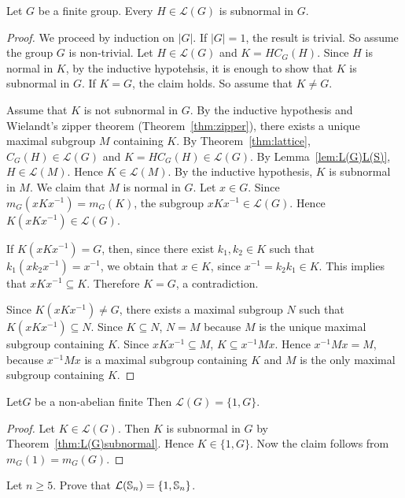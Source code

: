 \begin{theorem}
	\label{thm:L(G)subnormal}
	Let $G$ be a finite group. Every $H\in\mathcal{L}(G)$ is subnormal in $G$.
\end{theorem}

\begin{proof}
	We proceed by induction on $|G|$. If $|G|=1$, the result is trivial. So assume the group $G$ is non-trivial. Let $H\in\mathcal{L}(G)$ and $K=HC_G(H)$. Since $H$ is normal in $K$, by the inductive hypotehsis, 
    it is enough to show that 
	$K$ is subnormal in $G$. If $K=G$, the claim holds. So assume that 
	$K\ne G$. 

	Assume that $K$ is not subnormal in $G$. By the inductive hypothesis and 
    Wielandt's zipper theorem (Theorem~\ref{thm:zipper}), there exists a unique 
    maximal subgroup $M$ containing $K$. By Theorem~\ref{thm:lattice},
	$C_G(H)\in\mathcal{L}(G)$ and $K=HC_G(H)\in\mathcal{L}(G)$. By Lemma~\ref{lem:L(G)L(S)},
	$H\in\mathcal{L}(M)$. Hence $K\in\mathcal{L}(M)$. By the inductive hypothesis, $K$ is subnormal in $M$. We claim that $M$ is normal in $G$. Let $x\in G$. Since 
	$m_G(xKx^{-1})=m_G(K)$, the subgroup $xKx^{-1}\in\mathcal{L}(G)$. Hence 
	$K(xKx^{-1})\in\mathcal{L}(G)$. 
	
	If $K(xKx^{-1})=G$, then, since there exist $k_1,k_2\in K$ such that 
	$k_1(xk_2x^{-1})=x^{-1}$, we obtain that $x\in K$, since $x^{-1}=k_2k_1\in K$. This implies that $xKx^{-1}\subseteq K$. Therefore $K=G$, a contradiction.

	Since $K(xKx^{-1})\ne G$, there exists a maximal subgroup $N$ such that 
	$K(xKx^{-1})\subseteq N$. Since $K\subseteq N$, $N=M$ because $M$ is the unique
	maximal subgroup containing $K$. Since $xKx^{-1}\subseteq M$, $K\subseteq
	x^{-1}Mx$. Hence $x^{-1}Mx=M$, because $x^{-1}Mx$ is a maximal subgroup containing $K$ and $M$ is the only maximal subgroup containing $K$. 
\end{proof}

\begin{corollary}
	Let$G$ be a non-abelian finite Then $\mathcal{L}(G)=\{1,G\}$. 
\end{corollary}

\begin{proof}
	Let $K\in\mathcal{L}(G)$. Then $K$ is subnormal in $G$ by Theorem~\ref{thm:L(G)subnormal}. Hence $K\in\{1,G\}$. Now the claim follows from $m_G(1)=m_G(G)$. 
\end{proof}

\begin{exercise}
	Let $n\geq5$. Prove that $\mathcal{L}(\mathbb{S}_n)=\{1,\mathbb{S}_n\}$. 
\end{exercise}

